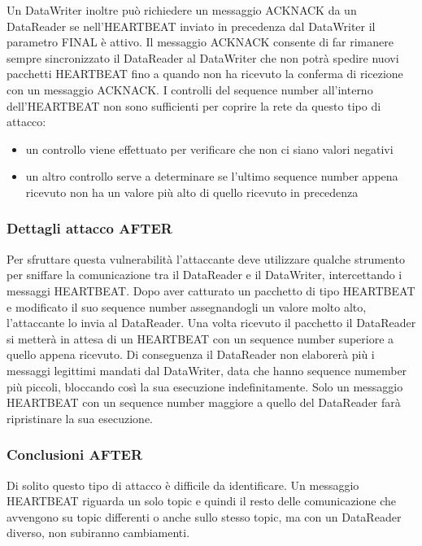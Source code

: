 Un DataWriter inoltre può richiedere un messaggio ACKNACK da un DataReader se
nell'HEARTBEAT inviato in precedenza dal DataWriter il parametro FINAL è attivo.
Il messaggio ACKNACK consente di far rimanere sempre sincronizzato il DataReader al 
DataWriter che non potrà spedire nuovi pacchetti HEARTBEAT fino a quando non ha 
ricevuto la conferma di ricezione con un messaggio ACKNACK.
I controlli del sequence number all'interno dell'HEARTBEAT 
non sono sufficienti per coprire la rete da questo tipo di attacco:
\begin{itemize}
    \item un controllo viene effettuato per verificare che non ci siano 
    valori negativi
    \item un altro controllo serve a determinare se l'ultimo sequence number 
    appena ricevuto non ha un valore più alto di quello ricevuto in precedenza
\end{itemize}
\subsubsection{Dettagli attacco AFTER}

Per sfruttare questa vulnerabilità l'attaccante deve utilizzare qualche 
strumento per sniffare la comunicazione tra il DataReader e il DataWriter,
intercettando i
messaggi HEARTBEAT. Dopo aver catturato un pacchetto di tipo HEARTBEAT e modificato 
il suo sequence number assegnandogli un valore molto alto, 
l'attaccante lo invia al DataReader.
Una volta ricevuto il pacchetto il DataReader si metterà in attesa di un HEARTBEAT 
con un
sequence number superiore a quello appena ricevuto. Di conseguenza il DataReader
non elaborerà più i messaggi legittimi mandati dal DataWriter,
data che hanno sequence numember più piccoli, bloccando così la sua
esecuzione indefinitamente. Solo un messaggio HEARTBEAT con un sequence number
maggiore a quello del DataReader farà ripristinare la sua esecuzione.


\subsubsection{Conclusioni AFTER}
Di solito questo tipo di attacco è difficile da identificare. 
Un messaggio HEARTBEAT riguarda un solo topic e quindi il resto delle
comunicazione che avvengono su topic differenti o anche sullo stesso 
topic, ma con un DataReader diverso, non subiranno cambiamenti.


